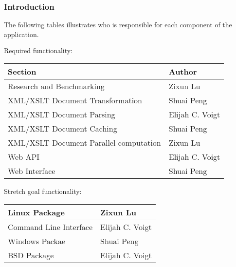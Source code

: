 \subsubsection{Introduction}

The following tables illustrates who is responsible for each component of the application.

Required functionality:

\begin{center}
    \begin{tabular}{ | l | p{10cm} |}
    \hline
    Section & Author \\ \hline
    Research and Benchmarking & Zixun Lu \\ \hline
    XML/XSLT Document Transformation & Shuai Peng \\ \hline
    XML/XSLT Document Parsing & Elijah C. Voigt \\ \hline
    XML/XSLT Document Caching & Shuai Peng \\ \hline
    XML/XSLT Document Parallel computation & Zixun Lu \\ \hline
    Web API & Elijah C. Voigt\\ \hline
    Web Interface & Shuai Peng \\ \hline
    \end{tabular}
\end{center}

Stretch goal functionality:

\begin{center}
    \begin{tabular}{ | l | p{10cm} |}
    \hline
    Linux Package & Zixun Lu \\ \hline
    Command Line Interface& Elijah C. Voigt \\ \hline
    Windows Packae & Shuai Peng \\ \hline
    BSD Package & Elijah C. Voigt \\ \hline
    \end{tabular}
\end{center}

\tableofcontents

\clearpage


\newpage

\printbibliography
